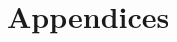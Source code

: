 \documentclass[12pt,a4paper,notitlepage,twoside,openright]{report}
\begin{document}
\begin{thebibliography}{100}

\end{thebibliography}


\newpage
\chapter*{Appendices}
\label{app}
\end{document}
